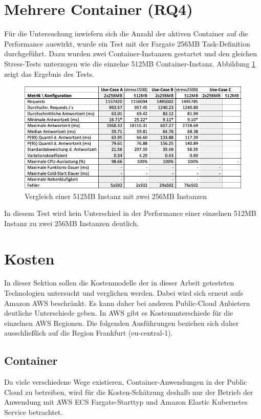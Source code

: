 \section{Mehrere Container (RQ4)}
Für die Untersuchung inwiefern sich die Anzahl der aktiven Container auf die Performance auswirkt, wurde ein Test mit der Fargate 256MB Task-Definition durchgeführt. Dazu wurden zwei Container-Instanzen gestartet und den gleichen Stress-Tests unterzogen wie die einzelne 512MB Container-Instanz. Abbildung \ref{fig:fargate-512-vs-2x256-stress-comparison} zeigt das Ergebnis des Tests.

\begin{figure}[H]
    \includegraphics[width=\textwidth]{img/fargate-512-vs-2x256-stress-comparison.png}
    \caption[Vergleich einer 512MB Instanz mit zwei 256MB Instanzen]{Vergleich einer 512MB Instanz mit zwei 256MB Instanzen}
    \label{fig:fargate-512-vs-2x256-stress-comparison}
\end{figure}

In diesem Test wird kein Unterschied in der Performance einer einzelnen 512MB Instanz zu zwei 256MB Instanzen deutlich.


\section{Kosten}
\label{sec:kosten}
In dieser Sektion sollen die Kostenmodelle der in dieser Arbeit getesteten Technologien untersucht und verglichen werden. Dabei wird sich erneut aufs Amazon AWS beschränkt. Es kann daher bei anderen Public-Cloud Anbietern deutliche Unterschiede geben. In AWS gibt es Kostenunterschiede für die einzelnen AWS Regionen. Die folgenden Ausführungen beziehen sich daher ausschließlich auf die Region Frankfurt (eu-central-1).

\subsection{Container}
Da viele verschiedene Wege existieren, Container-Anwendungen in der Public Cloud zu betreiben, wird für die Kosten-Schätzung deshalb nur der Betrieb der Anwendung mit AWS ECS Fargate-Starttyp und Amazon Elastic Kubernetes Service betrachtet.

